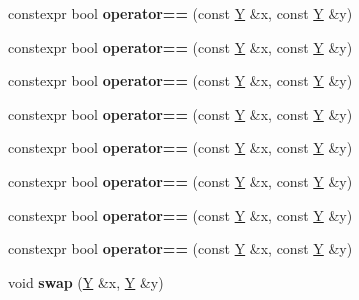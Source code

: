 \begin{DoxyCompactItemize}
\item 
\mbox{\label{struct_y_ac7e15ef8122a599998d833fb4113569c}} 
constexpr bool {\bfseries operator==} (const \mbox{\hyperlink{struct_y}{Y}} \&x, const \mbox{\hyperlink{struct_y}{Y}} \&y)
\item 
\mbox{\label{struct_y_ac7e15ef8122a599998d833fb4113569c}} 
constexpr bool {\bfseries operator==} (const \mbox{\hyperlink{struct_y}{Y}} \&x, const \mbox{\hyperlink{struct_y}{Y}} \&y)
\item 
\mbox{\label{struct_y_ac7e15ef8122a599998d833fb4113569c}} 
constexpr bool {\bfseries operator==} (const \mbox{\hyperlink{struct_y}{Y}} \&x, const \mbox{\hyperlink{struct_y}{Y}} \&y)
\item 
\mbox{\label{struct_y_ac7e15ef8122a599998d833fb4113569c}} 
constexpr bool {\bfseries operator==} (const \mbox{\hyperlink{struct_y}{Y}} \&x, const \mbox{\hyperlink{struct_y}{Y}} \&y)
\item 
\mbox{\label{struct_y_ac7e15ef8122a599998d833fb4113569c}} 
constexpr bool {\bfseries operator==} (const \mbox{\hyperlink{struct_y}{Y}} \&x, const \mbox{\hyperlink{struct_y}{Y}} \&y)
\item 
\mbox{\label{struct_y_ac7e15ef8122a599998d833fb4113569c}} 
constexpr bool {\bfseries operator==} (const \mbox{\hyperlink{struct_y}{Y}} \&x, const \mbox{\hyperlink{struct_y}{Y}} \&y)
\item 
\mbox{\label{struct_y_ac7e15ef8122a599998d833fb4113569c}} 
constexpr bool {\bfseries operator==} (const \mbox{\hyperlink{struct_y}{Y}} \&x, const \mbox{\hyperlink{struct_y}{Y}} \&y)
\item 
\mbox{\label{struct_y_ac7e15ef8122a599998d833fb4113569c}} 
constexpr bool {\bfseries operator==} (const \mbox{\hyperlink{struct_y}{Y}} \&x, const \mbox{\hyperlink{struct_y}{Y}} \&y)
\item 
\mbox{\label{struct_y_aa7f2267207d139b66d5838048c82f021}} 
void {\bfseries swap} (\mbox{\hyperlink{struct_y}{Y}} \&x, \mbox{\hyperlink{struct_y}{Y}} \&y)

\end{DoxyCompactItemize}
